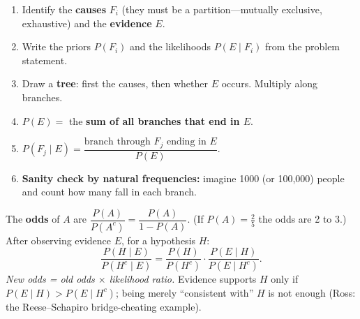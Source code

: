 \documentclass[11pt]{article}
\begin{document}
\begin{methodbox}
\begin{enumerate}
\item Identify the \textbf{causes} $F_i$ (they must be a partition---mutually exclusive, exhaustive) and the \textbf{evidence} $E$.
\item Write the priors $P(F_i)$ and the likelihoods $P(E\mid F_i)$ from the problem statement.
\item Draw a \textbf{tree}: first the causes, then whether $E$ occurs. Multiply along branches.
\item $P(E)=$ the \textbf{sum of all branches that end in $E$}.
\item $P(F_j\mid E)=\dfrac{\text{branch through }F_j\text{ ending in }E}{P(E)}$.
\item \textbf{Sanity check by natural frequencies:} imagine 1000 (or 100{,}000) people and count how many fall in each branch.
\end{enumerate}
\end{methodbox}

\begin{defbox}
The \textbf{odds} of $A$ are $\dfrac{P(A)}{P(A^c)}=\dfrac{P(A)}{1-P(A)}$. (If $P(A)=\tfrac25$ the odds are 2 to 3.) After observing evidence $E$, for a hypothesis $H$:
\[ \frac{P(H\mid E)}{P(H^c\mid E)}=\frac{P(H)}{P(H^c)}\cdot\frac{P(E\mid H)}{P(E\mid H^c)}. \]
\emph{New odds = old odds $\times$ likelihood ratio.} Evidence supports $H$ only if $P(E\mid H)>P(E\mid H^c)$; being merely ``consistent with'' $H$ is not enough (Ross: the Reese--Schapiro bridge-cheating example).
\end{defbox}
\end{document}
